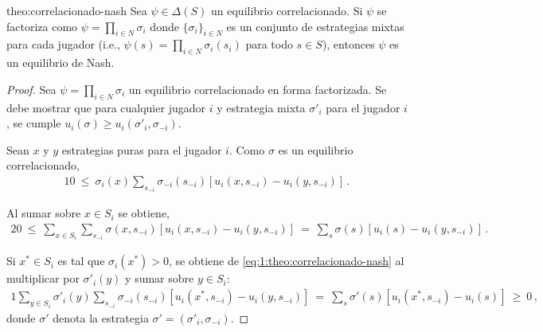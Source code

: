 \begin{reptheorem}{theo:correlacionado-nash}
Sea $\psi\in\Delta(S)$ un equilibrio correlacionado. Si $\psi$ se factoriza como $\psi=\prod_{i\in N} \sigma_i$ donde $\{\sigma_i\}_{i\in N}$ es un conjunto de estrategias mixtas para cada jugador (i.e., $\psi(s)=\prod_{i \in N} \sigma_i(s_i)$ para todo $s\in S$), entonces $\psi$ es un equilibrio de Nash.
\end{reptheorem}

\begin{proof}
Sea $\psi= \prod_{i \in N} \sigma_i$ un equilibrio correlacionado en forma factorizada. Se debe mostrar que para cualquier jugador $i$ y estrategia mixta $\sigma'_i$ para el jugador $i$, se cumple $u_i(\sigma) \geq u_i(\sigma'_i, \sigma_{-i})$.

Sean $x$ y $y$ estrategias puras para el jugador $i$.
Como $\sigma$ es un equilibrio correlacionado,
\begin{alignat}{1}
\label{eq:1:theo:correlacionado-nash}
0\ \leq\ \sigma_i(x) \sum_{s_{-i}} \sigma_{-i}(s_{-i})[u_i(x, s_{-i}) - u_i(y, s_{-i})] \,.
\end{alignat}

Al sumar sobre $x\in S_i$ se obtiene, 
\begin{alignat}{2}
\label{eq:2:theo:correlacionado-nash}
0\ \leq\ \sum_{x\in S_i} \sum_{s_{-i}} \sigma(x,s_{-i}) [u_i(x, s_{-i}) - u_i(y, s_{-i})]\ =\ \sum_s \sigma(s) [u_i(s) - u_i(y, s_{-i})] \,.
\end{alignat}

Si $x^* \in S_i$ es tal que $\sigma_i(x^*)>0$, se obtiene de \eqref{eq:1:theo:correlacionado-nash} al multiplicar por $\sigma'_i(y)$ y sumar sobre $y\in S_i$:
\begin{alignat}{1}
\label{eq:3:theo:correlacionado-nash}
\sum_{y \in S_i} \sigma'_i(y) \sum_{s_{-i}} \sigma_{-i} (s_{-i}) [u_i(x^*, s_{-i}) - u_i(y, s_{-i})]\ =\ \sum_{s} \sigma'(s) [u_i(x^*, s_{-i}) - u_i(s)]\ \geq\ 0 \,,
\end{alignat}
donde $\sigma'$ denota la estrategia $\sigma'=(\sigma'_i,\sigma_{-i})$. 


\end{proof}
